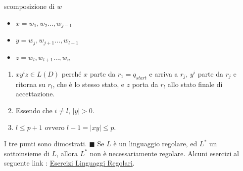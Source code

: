 \documentclass[10pt, letterpaper]{report}
\begin{document}
 scomposizione di $w$\begin{itemize}
    \item $x=w_1,w_2\dots,w_{j-1}$
    \item $y=w_j,w_{j+1}\dots,w_{l-1}$
    \item $z=w_l,w_{l+1}\dots,w_n$
 \end{itemize}\begin{enumerate}
    \item $xy^iz\in L(D)$ perché $x$ parte da $r_1=q_{start}$ e arriva a $r_j$, $y^i$ parte da $r_j$ e ritorna su $r_l$, che è 
    lo stesso stato, e $z$ porta da $r_l$ allo stato finale di accettazione.
    \item Essendo che $i\ne l$, $|y|>0$. 
    \item $l\le p+1$ ovvero $l-1=|xy|\le p$.
 \end{enumerate}
 I tre punti sono dimostrati. $\blacksquare$    \acc
 \prop{} Se $L$ è un linguaggio regolare, ed $L^*$ un sottoinsieme di 
 $L$, allora $L^*$ non è necessariamente regolare.\acc 
 Alcuni esercizi al seguente link : 
 \color{blue}\href{https://github.com/CasuFrost/University_notes/blob/main/Terzo%20Anno/Automi%2C%20Calcolabilit%C3%A0%20e%20Complessit%C3%A0/EsLinguaggiRegolari.pdf}{Esercizi Linguaggi Regolari}\color{black}.
 \flowerLine 
\end{document}
